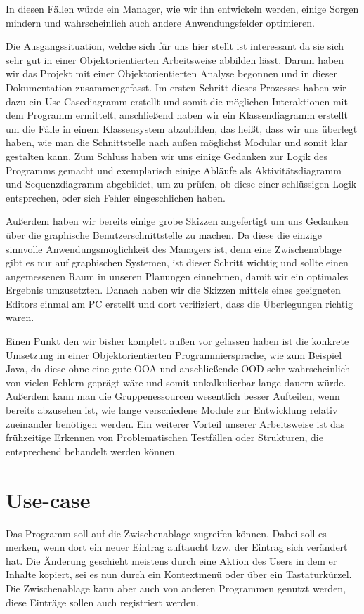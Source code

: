 \documentclass[a4paper,11pt,abstracton,titlepage]{scrartcl}
\begin{document}
In diesen Fällen würde ein Manager, wie wir ihn entwickeln werden, einige Sorgen
mindern und wahrscheinlich auch andere Anwendungsfelder optimieren. 

Die Ausgangssituation, welche sich für uns hier stellt ist interessant da sie
sich sehr gut in einer
Objektorientierten Arbeitsweise abbilden lässt. Darum haben wir das Projekt mit einer
Objektorientierten Analyse begonnen und in dieser Dokumentation zusammengefasst.
Im ersten Schritt dieses Prozesses haben wir dazu ein Use-Casediagramm erstellt und
somit die möglichen Interaktionen mit dem Programm ermittelt, anschließend haben
wir ein Klassendiagramm erstellt um die Fälle in einem Klassensystem abzubilden,
das heißt, dass wir uns überlegt haben, wie man die Schnittstelle nach außen
möglichst Modular und somit klar gestalten kann. Zum Schluss haben wir uns
einige Gedanken zur Logik des Programms gemacht und exemplarisch einige
Abläufe als Aktivitätsdiagramm und Sequenzdiagramm abgebildet, um zu prüfen, ob
diese einer schlüssigen Logik entsprechen, oder sich Fehler eingeschlichen
haben.

Außerdem haben wir bereits einige grobe Skizzen angefertigt um uns Gedanken über
die graphische Benutzerschnittstelle zu machen. Da diese die einzige sinnvolle
Anwendungsmöglichkeit des Managers ist, denn eine Zwischenablage gibt es nur auf
graphischen Systemen, ist dieser Schritt wichtig und sollte einen angemessenen
Raum in unseren Planungen einnehmen, damit wir ein optimales Ergebnis
umzusetzten. Danach haben wir die Skizzen mittels eines geeigneten Editors
einmal am PC erstellt und dort verifiziert, dass die Überlegungen richtig waren.

Einen Punkt den wir bisher komplett außen vor gelassen haben ist die konkrete
Umsetzung in einer Objektorientierten Programmiersprache, wie zum Beispiel Java,
da diese ohne eine gute OOA und anschließende OOD sehr wahrscheinlich von vielen
Fehlern geprägt wäre und somit unkalkulierbar lange dauern würde. Außerdem kann
man die Gruppenessourcen wesentlich besser Aufteilen, wenn bereits abzusehen
ist, wie lange verschiedene Module zur Entwicklung relativ zueinander benötigen
werden. Ein weiterer Vorteil unserer Arbeitsweise ist das frühzeitige Erkennen
von Problematischen Testfällen oder Strukturen, die entsprechend behandelt
werden können.

\section{Use-case}
Das Programm soll auf die Zwischenablage zugreifen können. Dabei soll es merken,
wenn dort ein neuer Eintrag auftaucht bzw. der Eintrag sich verändert hat. Die
Änderung geschieht meistens durch eine Aktion des Users in dem er Inhalte
kopiert, sei es nun durch ein Kontextmenü oder über ein Tastaturkürzel.
Die Zwischenablage kann aber auch von anderen Programmen genutzt werden, diese
Einträge sollen auch registriert werden.
\end{document}
